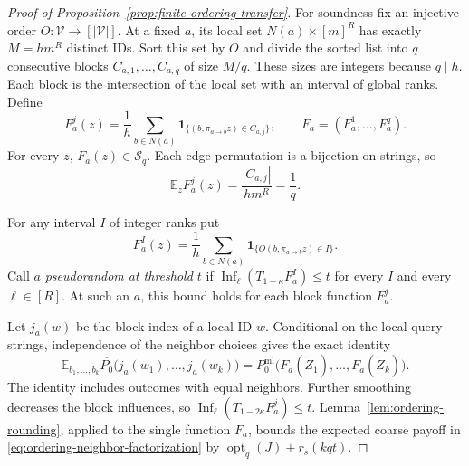 \begin{proof}[Proof of Proposition~\ref{prop:finite-ordering-transfer}]
For soundness fix an injective order \(O:\mathcal V\to[|\mathcal V|]\).
At a fixed \(a\), its local set \(N(a)\times[m]^R\) has exactly
\(M=hm^R\) distinct IDs.  Sort this set by \(O\) and divide the sorted
list into \(q\) consecutive blocks \(C_{a,1},\ldots,C_{a,q}\) of
size \(M/q\).  These sizes are integers because \(q\mid h\).
Each block is the intersection of the local set with an interval of
global ranks.  Define
\begin{equation}
 F_a^j(z)=\frac1h\sum_{b\in N(a)}
  \mathbf1_{\{(b,\pi_{a\to b}z)\in C_{a,j}\}},
 \qquad F_a=(F_a^1,\ldots,F_a^q).
\label{eq:ordering-block-functions}
\end{equation}
For every \(z\), \(F_a(z)\in\mathcal S_q\).  Each edge permutation
is a bijection on strings, so
\begin{equation}
 \mathbb E_z F_a^j(z)=\frac{|C_{a,j}|}{hm^R}=\frac1q.
\label{eq:ordering-block-mass}
\end{equation}

For any interval \(I\) of integer ranks put
\[
 F_a^I(z)=\frac1h\sum_{b\in N(a)}
   \mathbf1_{\{O(b,\pi_{a\to b}z)\in I\}}.
\]
Call \(a\) \emph{pseudorandom at threshold \(t\)} if
\(\operatorname{Inf}_\ell(T_{1-\kappa}F_a^I)\le t\) for every
\(I\) and every \(\ell\in[R]\).  At such an \(a\), this bound holds
for each block function \(F_a^j\).

Let \(j_a(w)\) be the block index of a local ID \(w\).  Conditional
on the local query strings, independence of the neighbor choices
gives the exact identity
\begin{equation}
 \mathbb E_{b_1,\ldots,b_k}
 \overline{P_0}\bigl(j_a(w_1),\ldots,j_a(w_k)\bigr)
 =
 P_0^{\mathrm{ml}}\bigl(F_a(\widetilde Z_1),\ldots,
                         F_a(\widetilde Z_k)\bigr).
\label{eq:ordering-neighbor-factorization}
\end{equation}
The identity includes outcomes with equal neighbors.  Further
smoothing decreases the block influences, so
\(\operatorname{Inf}_\ell(T_{1-2\kappa}F_a^j)\le t\).
Lemma~\ref{lem:ordering-rounding}, applied to the single function
\(F_a\), bounds the expected coarse payoff in
\eqref{eq:ordering-neighbor-factorization} by
\(\operatorname{opt}_q(J)+r_s(kqt)\).


\end{proof}
